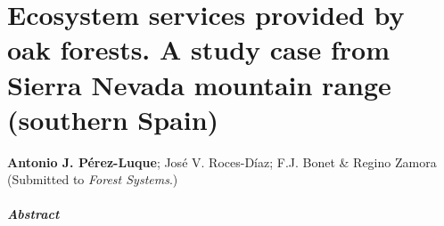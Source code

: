%
\chapter{\textcolor{ctcolormain}{Ecosystem services provided by \Qpw oak forests. A study case from Sierra Nevada mountain range (southern Spain)}}\label{sec:es}

\mbox{}
\vfill
{\color{ctcolormain}\textbf{Antonio J. Pérez-Luque}}; José V. Roces-Díaz; F.J. Bonet \& Regino Zamora (Submitted to \emph{Forest Systems}.)


\newpage

\paragraph{Abstract} \mbox{} \\
